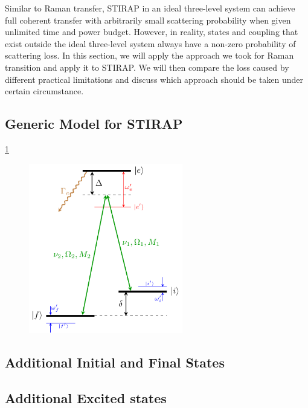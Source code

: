 Similar to Raman transfer, STIRAP in an ideal three-level system can achieve
full coherent transfer with arbitrarily small scattering probability
when given unlimited time and power budget.
However, in reality, states and coupling that exist outside the ideal three-level system
always have a non-zero probability of scattering loss.
In this section, we will apply the approach we took for Raman transition
and apply it to STIRAP. We will then compare the loss caused by different practical limitations
and discuss which approach should be taken under certain circumstance.

\subsection{Generic Model for STIRAP}

\ref{fig:raman-transfer-generic-stirap-model}

\begin{figure}
  \centering
  \includegraphics[width=0.6\textwidth]{figures/raman_transfer_generic_raman_model.pdf}
  \caption[Generic model for a real STIRAP]{
    \todo{}
    \label{fig:raman-transfer-generic-stirap-model}}
\end{figure}

\subsection{Additional Initial and Final States}

\subsection{Additional Excited states}

